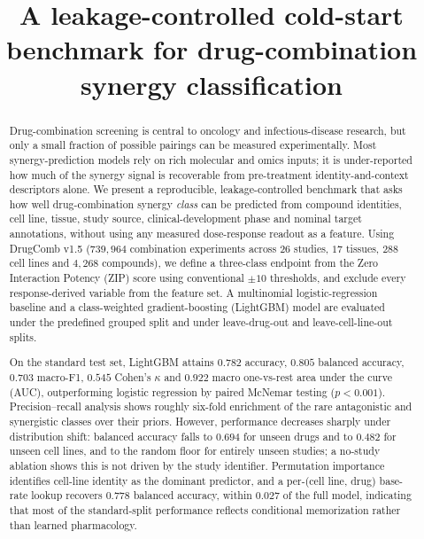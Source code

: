 \documentclass{bmcart}
\begin{document}
\begin{frontmatter}

\begin{fmbox}

\title{A leakage-controlled cold-start benchmark for drug-combination synergy classification}

\author[
   addressref={aff1},
   corref={aff1},
   email={xxp5066@psu.edu}
]{ }

\address[id=aff1]{%
  ,
  ,
}

\end{fmbox}%

\begin{abstractbox}

\begin{abstract}
Drug-combination screening is central to oncology and infectious-disease research, but only a small
fraction of possible pairings can be measured experimentally. Most synergy-prediction models rely on
rich molecular and omics inputs; it is under-reported how much of the synergy signal is recoverable
from pre-treatment identity-and-context descriptors alone. We present a reproducible, leakage-controlled
benchmark that asks how well drug-combination synergy \emph{class} can be predicted from compound
identities, cell line, tissue, study source, clinical-development phase and nominal target annotations,
without using any measured dose-response readout as a feature. Using DrugComb v1.5 ($739{,}964$
combination experiments across $26$ studies, $17$ tissues, $288$ cell lines and $4{,}268$ compounds),
we define a three-class endpoint from the Zero Interaction Potency (ZIP) score using conventional
$\pm 10$ thresholds, and exclude every response-derived variable from the feature set. A multinomial
logistic-regression baseline and a class-weighted gradient-boosting (LightGBM) model are evaluated under
the predefined grouped split and under leave-drug-out and leave-cell-line-out splits.

On the standard test set, LightGBM attains $0.782$ accuracy, $0.805$ balanced accuracy, $0.703$
macro-F1, $0.545$ Cohen's $\kappa$ and $0.922$ macro one-vs-rest area under the curve (AUC),
outperforming logistic regression by paired McNemar testing ($p<0.001$). Precision--recall analysis
shows roughly six-fold enrichment of the rare antagonistic and synergistic classes over their priors.
However, performance decreases sharply under distribution shift: balanced accuracy falls to $0.694$ for
unseen drugs and to $0.482$ for unseen cell lines, and to the random floor for entirely unseen studies;
a no-study ablation shows this is not driven by the study identifier. Permutation importance identifies
cell-line identity as the dominant predictor, and a per-(cell line, drug) base-rate lookup recovers
$0.778$ balanced accuracy, within $0.027$ of the full model, indicating that most of the standard-split
performance reflects conditional memorization rather than learned pharmacology.


\end{abstract}
\end{abstractbox}
\end{frontmatter}
\end{document}
